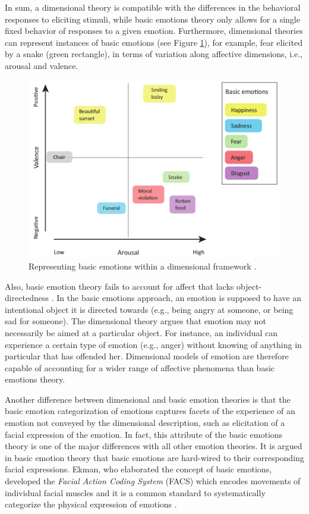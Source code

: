 \documentclass[12pt]{report}
\begin{document}
In sum, a dimensional theory is compatible with the differences in the
behavioral responses to eliciting stimuli, while basic emotions theory only
allows for a single fixed behavior of responses to a given emotion. Furthermore,
dimensional theories can represent instances of basic emotions (see Figure
\ref{fig:dimensional-discrete}), for example, fear elicited by a snake (green
rectangle), in terms of variation along affective dimensions, i.e., arousal and
valence.

\begin{figure}[t]
  \center
  \includegraphics[width=.9\textwidth]{figure/dimensional-discrete.png}
  \caption{Representing basic emotions within a dimensional framework
  \cite{hamann:mapping-discrete-dimensional}.}
  \label{fig:dimensional-discrete}
\end{figure}

Also, basic emotion theory fails to account for affect that lacks
object-directedness \cite{russell:core-affect}. In the basic emotions approach,
an emotion is supposed to have an intentional object it is directed towards (e.g.,
being angry at someone, or being sad for someone). The dimensional theory argues
that emotion may not necessarily be aimed at a particular object. For instance,
an individual can experience a certain type of emotion (e.g., anger) without
knowing of anything in particular that has offended her. Dimensional models of
emotion are therefore capable of accounting for a wider range of affective
phenomena than basic emotions theory.

Another difference between dimensional and basic emotion theories is that the
basic emotion categorization of emotions captures facets of the experience of
an emotion not conveyed by the dimensional description, such as elicitation of a
facial expression of the emotion. In fact, this attribute of the basic
emotions theory is one of the major differences with all other emotion theories.
It is argued in basic emotion theory that basic emotions are hard-wired to their
corresponding facial expressions. Ekman, who elaborated the concept of basic
emotions, developed the \textit{Facial Action Coding System} (FACS) which
encodes movements of individual facial muscles and it is a common standard to
systematically categorize the physical expression of emotions
\cite{ekman:facial-movement}.
\end{document}
